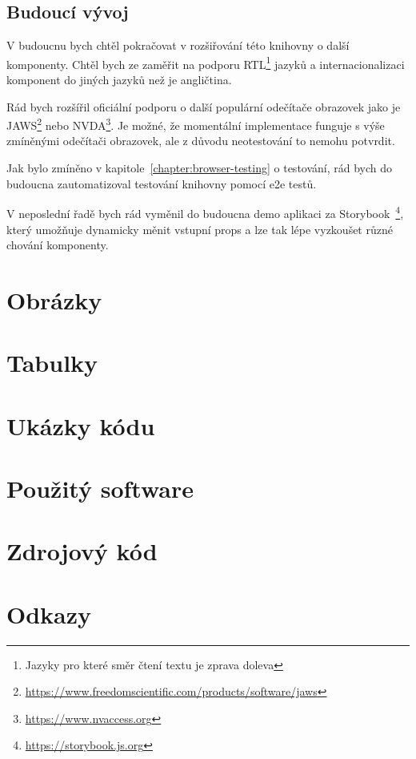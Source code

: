 \documentclass{ctuthesis}
\begin{document}
\section{Budoucí vývoj}

V budoucnu bych chtěl pokračovat v rozšiřování této knihovny o další komponenty.
Chtěl bych ze zaměřit na podporu RTL\footnote{Jazyky pro které směr čtení textu je zprava doleva} jazyků a internacionalizaci komponent do jiných jazyků než je angličtina.

Rád bych rozšířil oficiální podporu o další populární odečítače obrazovek jako je JAWS\footnote{\url{https://www.freedomscientific.com/products/software/jaws}} nebo NVDA\footnote{\url{https://www.nvaccess.org}}.
Je možné, že momentální implementace funguje s výše zmíněnými odečítači obrazovek, ale z důvodu neotestování to nemohu potvrdit.

Jak bylo zmíněno v kapitole~\ref{chapter:browser-testing} o testování, rád bych do budoucna zautomatizoval testování knihovny pomocí \gls{e2e} testů.

V neposlední řadě bych rád vyměnil do budoucna demo aplikaci za Storybook~\footnote{\url{https://storybook.js.org}}, který umožňuje dynamicky měnit vstupní props a lze tak lépe vyzkoušet různé chování komponenty.

\appendix

\printbibliography[title={Seznam literatury}]

\chapter{Obrázky}



\chapter{Tabulky}



\chapter{Ukázky kódu}



\chapter{Použitý software}



\chapter{Zdrojový kód}



\chapter{Odkazy}


\end{document}

